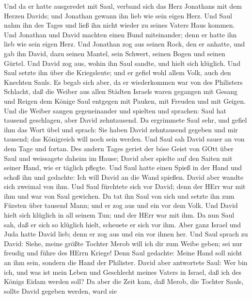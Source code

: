  Und da er hatte ausgeredet mit Saul, verband sich das Herz
Jonathans mit dem Herzen Davids; und Jonathan gewann ihn lieb wie sein
eigen Herz.  Und Saul nahm ihn des Tages und ließ ihn nicht
wieder zu seines Vaters Haus kommen.  Und Jonathan und David
machten einen Bund miteinander; denn er hatte ihn lieb wie sein eigen
Herz.  Und Jonathan zog aus seinen Rock, den er anhatte, und
gab ihn David, dazu seinen Mantel, sein Schwert, seinen Bogen und seinen
Gürtel.  Und David zog aus, wohin ihn Saul sandte, und hielt
sich klüglich. Und Saul setzte ihn über die Kriegsleute; und er gefiel
wohl allem Volk, auch den Knechten Sauls.  Es begab sich
aber, da er wiederkommen war von des Philisters Schlacht, daß die Weiber
aus allen Städten Israels waren gegangen mit Gesang und Reigen dem
Könige Saul entgegen mit Pauken, mit Freuden und mit Geigen.
 Und die Weiber sangen gegeneinander und spielten und
sprachen: Saul hat tausend geschlagen, aber David zehntausend.
 Da ergrimmete Saul sehr, und gefiel ihm das Wort übel und
sprach: Sie haben David zehntausend gegeben und mir tausend; das
Königreich will noch sein werden.  Und Saul sah David sauer
an von dem Tage und fortan.  Des andern Tages geriet der
böse Geist von GOtt über Saul und weissagete daheim im Hause; David aber
spielte auf den Saiten mit seiner Hand, wie er täglich pflegte. Und Saul
hatte einen Spieß in der Hand  und schoß ihn und gedachte:
Ich will David an die Wand spießen. David aber wandte sich zweimal von
ihm.  Und Saul fürchtete sich vor David; denn der HErr war
mit ihm und war von Saul gewichen.  Da tat ihn Saul von
sich und setzte ihn zum Fürsten über tausend Mann; und er zog aus und
ein vor dem Volk.  Und David hielt sich klüglich in all
seinem Tun; und der HErr war mit ihm.  Da nun Saul sah, daß
er sich so klüglich hielt, scheuete er sich vor ihm.  Aber
ganz Israel und Juda hatte David lieb; denn er zog aus und ein vor ihnen
her.  Und Saul sprach zu David: Siehe, meine größte Tochter
Merob will ich dir zum Weibe geben; sei nur freudig und führe des HErrn
Kriege! Denn Saul gedachte: Meine Hand soll nicht an ihm sein, sondern
die Hand der Philister.  David aber antwortete Saul: Wer
bin ich, und was ist mein Leben und Geschlecht meines Vaters in Israel,
daß ich des Königs Eidam werden soll?  Da aber die Zeit
kam, daß Merob, die Tochter Sauls, sollte David gegeben werden, ward sie
